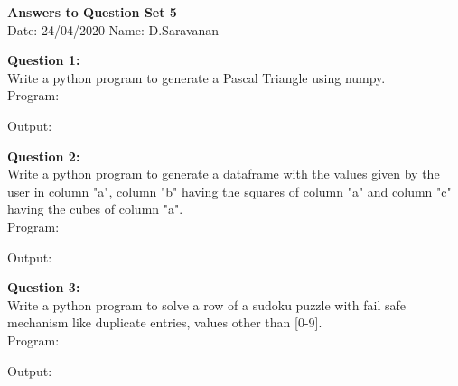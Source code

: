 \documentclass[a4paper,11pt,openright]{report}
\begin{document}
\singlespacing
\pagestyle{plain}

\begin{center}
\textbf{Answers to Question Set 5} \\
Date: 24/04/2020 \hspace{2mm} Name: D.Saravanan
\end{center}

\vspace{50px}

\textbf{Question 1:} \\
Write a python program to generate a Pascal Triangle using numpy. \\

Program: 


\vspace{10px}

Output:


\vspace{50px}

\textbf{Question 2:} \\
Write a python program to generate a dataframe with the values given by the user in
column "a", column "b" having the squares of column "a" and column "c" having the cubes of
column "a". \\

Program:


\vspace{10px}

Output:


\vspace{30px}

\pagebreak

\textbf{Question 3:} \\
Write a python program to solve a row of a sudoku puzzle with fail safe mechanism like
duplicate entries, values other than [0-9]. \\

Program:


\vspace{10px}

Output:

\end{document}
